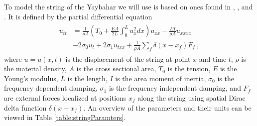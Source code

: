 \documentclass{article}
\begin{document}
To model the string of the Yaybahar we will use is based on ones found in \cite[Chapters~6,7, and 8] {bilbao_numerical_2009}, \cite{bilbao_modular_2009}, and \cite{bensa_simulation_2003}.
It is defined by the partial differential equation
\begin{align}
  \begin{split}
  u_{tt} &= \frac{1}{\rho A} \left(T_0 + \frac{E A}{2L} \int_0^L u_x^2 dx \right)u_{xx} - \frac{E I}{\rho A} u_{xxxx}\\
  &- 2 \sigma_0 u_t + 2 \sigma_1 u_{txx} + \frac{1}{\rho A}\sum_f\delta(x-x_f)F_f\ ,
  \end{split}
  \label{eq:stiffNonlinearString}
\end{align}
where $u = u(x, t)$ is the displacement of the string at point $x$ and time $t$, $\rho$ is the material density, $A$ is the cross sectional area, $T_0$ is the tension, $E$ is the Young's modulus, $L$ is the length, $I$ is the area moment of inertia, $\sigma_0$ is the frequency dependent damping, $\sigma_1$ is the frequency independent damping, and $F_f$ are external forces localized at positions $x_f$ along the string using spatial Dirac delta function $\delta(x-x_f)$.
An overview of the parameters and their units can be viewed in Table \ref{table:stringParamters}.
\end{document}
